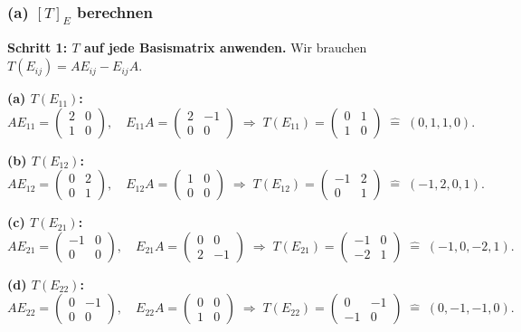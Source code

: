 \documentclass[a4paper,12pt]{article}
\begin{document}
\subsubsection*{(a) $[T]_E$ berechnen}

\textbf{Schritt 1: $T$ auf jede Basismatrix anwenden.} Wir brauchen $T(E_{ij}) = A E_{ij} - E_{ij} A$.

\textbf{(a) $T(E_{11})$:}
\[
A E_{11} = \begin{pmatrix} 2 & 0 \\ 1 & 0 \end{pmatrix},\quad
E_{11} A = \begin{pmatrix} 2 & -1 \\ 0 & 0 \end{pmatrix}
\;\Rightarrow\;
T(E_{11}) = \begin{pmatrix} 0 & 1 \\ 1 & 0 \end{pmatrix}
\;\widehat{=}\; (0, 1, 1, 0).
\]

\textbf{(b) $T(E_{12})$:}
\[
A E_{12} = \begin{pmatrix} 0 & 2 \\ 0 & 1 \end{pmatrix},\quad
E_{12} A = \begin{pmatrix} 1 & 0 \\ 0 & 0 \end{pmatrix}
\;\Rightarrow\;
T(E_{12}) = \begin{pmatrix} -1 & 2 \\ 0 & 1 \end{pmatrix}
\;\widehat{=}\; (-1, 2, 0, 1).
\]

\textbf{(c) $T(E_{21})$:}
\[
A E_{21} = \begin{pmatrix} -1 & 0 \\ 0 & 0 \end{pmatrix},\quad
E_{21} A = \begin{pmatrix} 0 & 0 \\ 2 & -1 \end{pmatrix}
\;\Rightarrow\;
T(E_{21}) = \begin{pmatrix} -1 & 0 \\ -2 & 1 \end{pmatrix}
\;\widehat{=}\; (-1, 0, -2, 1).
\]

\textbf{(d) $T(E_{22})$:}
\[
A E_{22} = \begin{pmatrix} 0 & -1 \\ 0 & 0 \end{pmatrix},\quad
E_{22} A = \begin{pmatrix} 0 & 0 \\ 1 & 0 \end{pmatrix}
\;\Rightarrow\;
T(E_{22}) = \begin{pmatrix} 0 & -1 \\ -1 & 0 \end{pmatrix}
\;\widehat{=}\; (0, -1, -1, 0).
\]
\end{document}
